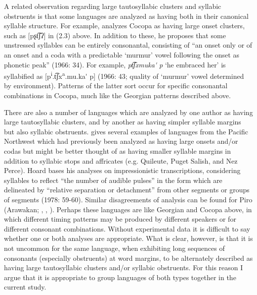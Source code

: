   A related observation regarding large tautosyllabic clusters and syllabic obstruents is that some languages are analyzed as having both in their canonical syllable structure. For example, \citet{Crawford1966} analyzes Cocopa as having large onset clusters, such as [pʂt͡ʃʔ] in (2.3) above. In addition to these, he proposes that some unstressed syllables can be entirely consonantal, consisting of “an onset only or of an onset and a coda with a predictable ‘murmur’ vowel following the onset as phonetic peak” (1966: 34). For example, \textit{pt͡ʃxmuka\'{} p} ‘he embraced her’ is syllabified as [p\textsuperscript{i}.t͡ʃx\textsuperscript{a}.mu.ka\'{} p] (1966: 43; quality of ‘murmur’ vowel determined by environment). Patterns of the latter sort occur for specific consonantal combinations in Cocopa, much like the Georgian patterns described above. 

  There are also a number of languages which are analyzed by one author as having large tautosyllabic clusters, and by another as having simpler syllable margins but also syllabic obstruents. \citet{Hoard1978} gives several examples of languages from the Pacific Northwest which had previously been analyzed as having large onsets and/or codas but might be better thought of as having smaller syllable margins in addition to syllabic stops and affricates (e.g. Quileute, Puget Salish, and Nez Perce). Hoard bases his analyses on impressionistic transcriptions, considering syllables to reflect “the number of audible pulses” in the form which are delineated by “relative separation or detachment” from other segments or groups of segments (1978: 59-60). Similar disagreements of analysis can be found for Piro (Arawakan; \citealt{Matteson1965}, \citealt{Lin1997}, \citealt{Hanson2010}). Perhaps these languages are like Georgian and Cocopa above, in which different timing patterns may be produced by different speakers or for different consonant combinations. Without experimental data it is difficult to say whether one or both analyses are appropriate. What is clear, however, is that it is not uncommon for the same language, when exhibiting long sequences of consonants (especially obstruents) at word margins, to be alternately described as having large tautosyllabic clusters and/or syllabic obstruents. For this reason I argue that it is appropriate to group languages of both types together in the current study.

